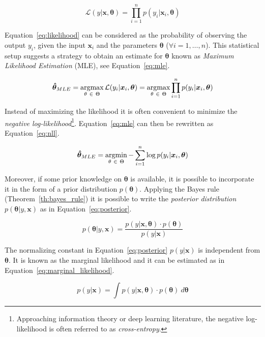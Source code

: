 \begin{equation} \label{eq:likelihood}
	\mathcal{L}(y|\bm{x}, \bm{\theta}) = \prod_{i=1}^{n} p(y_i | \bm{x}_i , \bm{\theta})
\end{equation}

Equation~\eqref{eq:likelihood} can be considered as the probability of observing the output $y_i$, given the input $\bm{x}_i$ and the parameters $\bm{\theta}$ ($\forall i=1,\dots,n$).
This statistical setup suggests a strategy to obtain an estimate for $\bm{\theta}$ known as \textit{Maximum Likelihood Estimation} (MLE), see Equation~\eqref{eq:mle}.

\begin{equation} \label{eq:mle}
	\bm{\hat \theta}_{MLE} =\mathop{\mathrm{argmax}}\limits_{\theta~\in~\Theta}\mathcal{L}(y_i|\bm{x}_i, \bm{\theta}) = \mathop{\mathrm{argmax}}\limits_{\theta~\in~\Theta} \prod_{i=1}^{n} p(y_i | \bm{x}_i, \bm{\theta})
\end{equation}

Instead of maximizing the likelihood it is often convenient to minimize the \textit{negative log-likelihood}\footnote{ Approaching information theory or deep learning literature, the negative log-likelihood is often referred to as \textit{cross-entropy}.}. Equation~\eqref{eq:mle} can then be rewritten as Equation~\eqref{eq:nll}.

\begin{equation} \label{eq:nll}
	\bm{\hat \theta}_{MLE} = \mathop{\mathrm{argmin}}\limits_{\theta~\in~\Theta} - \sum_{i=1}^n \log p(y_i | \bm{x}_i, \bm{\theta})
\end{equation}

Moreover, if some prior knowledge on $\bm{\theta}$ is available, it is possible to incorporate it in the form of a prior distribution $p(\bm{\theta})$. Applying the Bayes rule (Theorem~\ref{th:bayes_rule}) it is possible to write the \textit{posterior distribution} $p(\bm{\theta}|y,\bm{x})$ as in Equation~\eqref{eq:posterior}.

\begin{equation} \label{eq:posterior}
	p(\bm{\theta}|y,\bm{x}) = \frac{p(y|\bm{x}, \bm{\theta}) \cdot p(\bm{\theta})}{p(y|\bm{x})}
\end{equation}

The normalizing constant in Equation~\eqref{eq:posterior} $p(y|\bm{x})$ is independent from $\bm{\theta}$. It is known as the marginal likelihood and it can be estimated as in Equation~\eqref{eq:marginal_likelihood}.

\begin{equation} \label{eq:marginal_likelihood}
	p(y|\bm{x}) = \int p(y|\bm{x}, \bm{\theta}) \cdot p(\bm{\theta})~d\bm{\theta}
\end{equation}

